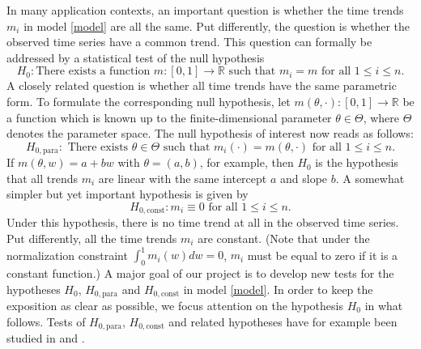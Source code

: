 \documentclass[a4paper,12pt]{article}
\begin{document}
 
\noindent In many application contexts, an important question is whether the time trends $m_i$ in model \eqref{model} are all the same. Put differently, the question is whether the observed time series
have a common trend. This question can formally be addressed by a statistical test of the null hypothesis 
\[ H_0: \text{There exists a function } m: [0,1] \rightarrow \mathbb{R} \text{ such that } m_i = m  \text{ for all } 1 \le i \le n. \]
A closely related question is whether all time trends have the same parametric form. To formulate the corresponding null hypothesis, let $m(\theta,\cdot): [0,1] \rightarrow \mathbb{R}$ be a function which is known up to the finite-dimensional parameter $\theta \in \Theta$, where $\Theta$ denotes the parameter space. The null hypothesis of interest now reads as follows:  
\[ H_{0,\text{para}}: \text{ There exists } \theta \in \Theta \text{ such that } m_i(\cdot) = m(\theta,\cdot) \text{ for all } 1 \le i \le n. \]  
If $m(\theta,w) = a + b w$ with $\theta = (a,b)$, for example, then $H_0$ is the hypothesis that all trends $m_i$ are linear with the same intercept $a$ and slope $b$. A somewhat simpler but yet important hypothesis is given by 
\[ H_{0,\text{const}}: m_i \equiv 0 \text{ for all } 1 \le i \le n. \]
Under this hypothesis, there is no time trend at all in the observed time series. Put differently, all the time trends $m_i$ are constant. (Note that under the normalization constraint $\int_0^1 m_i(w) dw = 0$, $m_i$ must be equal to zero if it is a constant function.) A major goal of our project is to develop new tests for the hypotheses $H_0$, $H_{0,\text{para}}$ and $H_{0,\text{const}}$ in model \eqref{model}. In order to keep the exposition as clear as possible, we focus attention on the hypothesis $H_0$ in what follows. Tests of $H_{0,\text{para}}$, $H_{0,\text{const}}$ and related hypotheses have for example been studied in \cite{Lyubchich2016} and \cite{ChenWu2018}. 
\end{document}
